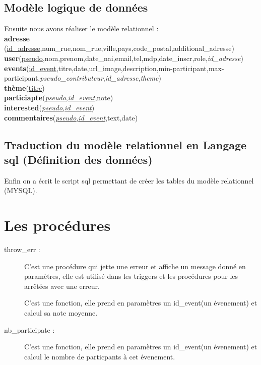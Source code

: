 \documentclass[oneside,11pt,a4paper]{article}
\begin{document}
\subsection{Modèle logique de données}
Ensuite nous avons réaliser le modèle relationnel : 
\\	
\textbf{adresse} (\underline{id\_adresse},num\_rue,nom\_rue,ville,pays,code\_postal,additional\_adresse)\\
\textbf{user}(\underline{pseudo},nom,prenom,date\_nai,email,tel,mdp,date\_inscr,role,\textit{id\_adresse})\\
\textbf{events}(\underline{id\_event},titre,date,url\_image,description,min-participant,max-participant,\textit{pseudo\_contributeur},\textit{id\_adresse},\textit{theme})\\
\textbf{thème}(\underline{titre})\\
\textbf{particiapte}(\underline{\textit{pseudo},\textit{id\_event}},note)\\
\textbf{interested}(\underline{\textit{pseudo},\textit{id\_event}})\\
\textbf{commentaires}(\underline{\textit{pseudo},\textit{id\_event}},text,date)\\

\subsection{Traduction du modèle relationnel en Langage sql (Définition des données)}
Enfin on a écrit le script sql permettant de créer les tables du modèle relationnel (MYSQL).
\section{Les procédures}
\begin{description}
	\item[ throw\_err : ] C'est une procédure qui jette une erreur et affiche  un message donné en paramètres, elle est utilisé dans les triggers et les procédures pour les arrêtées avec une erreur.
	 
	\item[ ] C'est une fonction, elle prend en paramètres un id\_event(un évenement) et calcul sa note moyenne.
	\item[] 
	\item[nb\_participate : ] C'est une fonction, elle prend en paramètres un id\_event(un évenement) et calcul le nombre de particpants à cet évenement.
\end{description}
\end{document}
